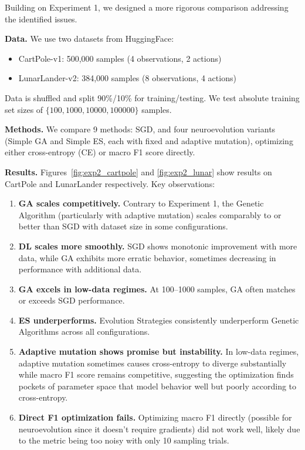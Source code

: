 \documentclass{article}
\begin{document}
Building on Experiment 1, we designed a more rigorous comparison addressing the identified issues.

\textbf{Data.} We use two datasets from HuggingFace:
\begin{itemize}
    \item CartPole-v1: 500,000 samples (4 observations, 2 actions)
    \item LunarLander-v2: 384,000 samples (8 observations, 4 actions)
\end{itemize}
Data is shuffled and split 90\%/10\% for training/testing. We test absolute training set sizes of $\{100, 1000, 10000, 100000\}$ samples.

\textbf{Methods.} We compare 9 methods: SGD, and four neuroevolution variants (Simple GA and Simple ES, each with fixed and adaptive mutation), optimizing either cross-entropy (CE) or macro F1 score directly.

\textbf{Results.} Figures~\ref{fig:exp2_cartpole} and \ref{fig:exp2_lunar} show results on CartPole and LunarLander respectively. Key observations:

\begin{enumerate}
    \item \textbf{GA scales competitively.} Contrary to Experiment 1, the Genetic Algorithm (particularly with adaptive mutation) scales comparably to or better than SGD with dataset size in some configurations.

    \item \textbf{DL scales more smoothly.} SGD shows monotonic improvement with more data, while GA exhibits more erratic behavior, sometimes decreasing in performance with additional data.

    \item \textbf{GA excels in low-data regimes.} At 100--1000 samples, GA often matches or exceeds SGD performance.

    \item \textbf{ES underperforms.} Evolution Strategies consistently underperform Genetic Algorithms across all configurations.

    \item \textbf{Adaptive mutation shows promise but instability.} In low-data regimes, adaptive mutation sometimes causes cross-entropy to diverge substantially while macro F1 score remains competitive, suggesting the optimization finds pockets of parameter space that model behavior well but poorly according to cross-entropy.

    \item \textbf{Direct F1 optimization fails.} Optimizing macro F1 directly (possible for neuroevolution since it doesn't require gradients) did not work well, likely due to the metric being too noisy with only 10 sampling trials.
\end{enumerate}
\end{document}
